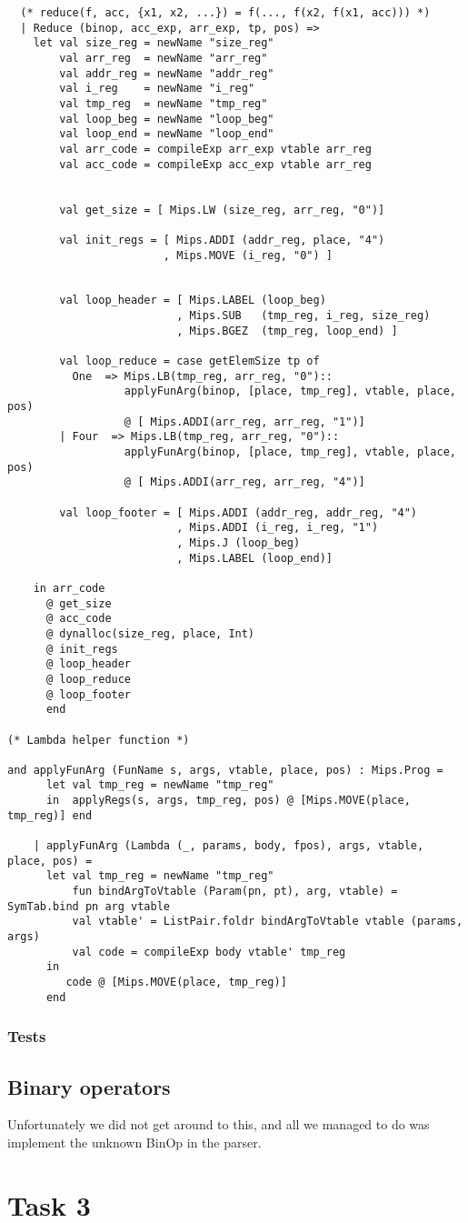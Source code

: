 \documentclass[12pt]{article}
\begin{document}
\begin{verbatim}
  (* reduce(f, acc, {x1, x2, ...}) = f(..., f(x2, f(x1, acc))) *)
  | Reduce (binop, acc_exp, arr_exp, tp, pos) =>
    let val size_reg = newName "size_reg"
        val arr_reg  = newName "arr_reg"
        val addr_reg = newName "addr_reg"
        val i_reg    = newName "i_reg"
        val tmp_reg  = newName "tmp_reg"
        val loop_beg = newName "loop_beg"
        val loop_end = newName "loop_end"
        val arr_code = compileExp arr_exp vtable arr_reg
        val acc_code = compileExp acc_exp vtable arr_reg

        
        val get_size = [ Mips.LW (size_reg, arr_reg, "0")]

        val init_regs = [ Mips.ADDI (addr_reg, place, "4")
                        , Mips.MOVE (i_reg, "0") ]


        val loop_header = [ Mips.LABEL (loop_beg)
                          , Mips.SUB   (tmp_reg, i_reg, size_reg)
                          , Mips.BGEZ  (tmp_reg, loop_end) ]

        val loop_reduce = case getElemSize tp of
          One  => Mips.LB(tmp_reg, arr_reg, "0")::
                  applyFunArg(binop, [place, tmp_reg], vtable, place, pos)
                  @ [ Mips.ADDI(arr_reg, arr_reg, "1")]
        | Four  => Mips.LB(tmp_reg, arr_reg, "0")::
                  applyFunArg(binop, [place, tmp_reg], vtable, place, pos)
                  @ [ Mips.ADDI(arr_reg, arr_reg, "4")]

        val loop_footer = [ Mips.ADDI (addr_reg, addr_reg, "4")
                          , Mips.ADDI (i_reg, i_reg, "1")
                          , Mips.J (loop_beg)
                          , Mips.LABEL (loop_end)]

    in arr_code
      @ get_size
      @ acc_code
      @ dynalloc(size_reg, place, Int)
      @ init_regs
      @ loop_header
      @ loop_reduce
      @ loop_footer
      end

(* Lambda helper function *)

and applyFunArg (FunName s, args, vtable, place, pos) : Mips.Prog =
      let val tmp_reg = newName "tmp_reg"
      in  applyRegs(s, args, tmp_reg, pos) @ [Mips.MOVE(place, tmp_reg)] end

    | applyFunArg (Lambda (_, params, body, fpos), args, vtable, place, pos) =
      let val tmp_reg = newName "tmp_reg"
          fun bindArgToVtable (Param(pn, pt), arg, vtable) = SymTab.bind pn arg vtable
          val vtable' = ListPair.foldr bindArgToVtable vtable (params, args)
          val code = compileExp body vtable' tmp_reg
      in
         code @ [Mips.MOVE(place, tmp_reg)]
      end
\end{verbatim}
\subsubsection{Tests}
\subsection{Binary operators}
Unfortunately we did not get around to this, and all we managed to do was implement the unknown BinOp in the parser.
\section{Task 3}
\end{document}
